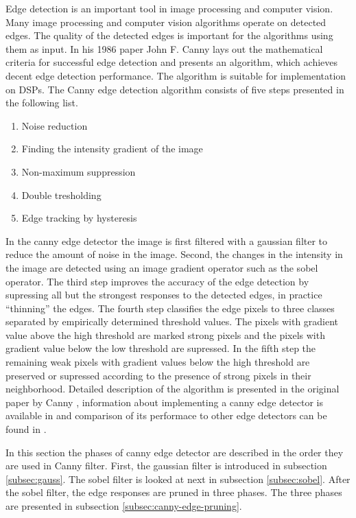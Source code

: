 Edge detection is an important tool in image processing and computer vision. Many image processing and computer vision algorithms operate on detected edges. The quality of the detected edges is important for the algorithms using them as input. In his 1986 paper John F. Canny \cite{canny1986computational} lays out the mathematical criteria for successful edge detection and presents an algorithm, which achieves decent edge detection performance. The algorithm is suitable for implementation on DSPs. The Canny edge detection algorithm consists of five steps presented in the following list.

\begin{enumerate}
    \item{Noise reduction}
    \item{Finding the intensity gradient of the image}
    \item{Non-maximum suppression}
    \item{Double tresholding}
    \item{Edge tracking by hysteresis}
\end{enumerate}

In the canny edge detector the image is first filtered with a gaussian filter to reduce the amount of noise in the image. Second, the changes in the intensity in the image are detected using an image gradient operator such as the sobel operator. The third step improves the accuracy of the edge detection by supressing all but the strongest responses to the detected edges, in practice ``thinning'' the edges. The fourth step classifies the edge pixels to three classes separated by empirically determined threshold values. The pixels with gradient value above the high threshold are marked strong pixels and the pixels with gradient value below the low threshold are supressed. In the fifth step the remaining weak pixels with gradient values below the high threshold are preserved or supressed according to the presence of strong pixels in their neighborhood. Detailed description of the algorithm is presented in the original paper by Canny \cite{canny1986computational}, information about implementing a canny edge detector is available in \cite{gonzalez2008digital} and comparison of its performace to other edge detectors can be found in \cite{maini2009study}.

In this section the phases of canny edge detector are described in the order they are used in Canny filter. First, the gaussian filter is introduced in subsection \ref{subsec:gauss}. The sobel filter is looked at next in subsection \ref{subsec:sobel}. After the sobel filter, the edge responses are pruned in three phases. The three phases are presented in subsection \ref{subsec:canny-edge-pruning}.

